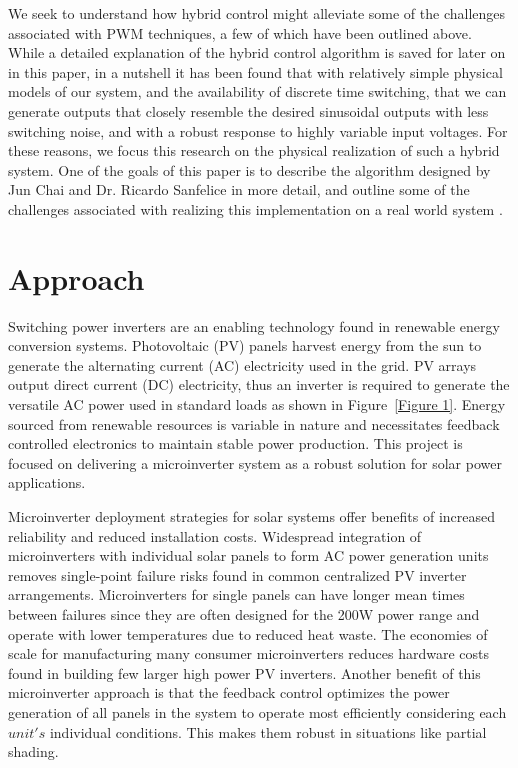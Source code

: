 We seek to understand how hybrid control might alleviate some of the challenges associated with PWM techniques, a few of which have been outlined above. While a detailed explanation of the hybrid control algorithm is saved for later on in this paper, in a nutshell it has been found that with relatively simple physical models of our system, and the availability of discrete time switching, that we can generate outputs that closely resemble the desired sinusoidal outputs with less switching noise, and with a robust response to highly variable input voltages. For these reasons, we focus this research on the physical realization of such a hybrid system. One of the goals of this paper is to describe the algorithm designed by Jun Chai and Dr. Ricardo Sanfelice in more detail, and outline some of the challenges associated with realizing this implementation on a real world system \cite{ricardo}.


\section{Approach}
Switching power inverters are an enabling technology found in renewable energy conversion systems. Photovoltaic (PV) panels harvest energy from the sun to generate the alternating current (AC) electricity used in the grid. PV arrays output direct current (DC) electricity, thus an inverter is required to generate the versatile AC power used in standard loads as shown in Figure~\ref{Figure 1}. Energy sourced from renewable resources is variable in nature and necessitates feedback controlled electronics to maintain stable power production.  This project is focused on delivering a microinverter system as a robust solution for solar power applications. 

Microinverter deployment strategies for solar systems offer benefits of increased reliability and reduced installation costs. Widespread integration of microinverters with individual solar panels to form AC power generation units removes single-point failure risks found in common centralized PV inverter arrangements. Microinverters for single panels can have longer mean times between failures since they are often designed for the 200W power range and operate with lower temperatures due to reduced heat waste. The economies of scale for manufacturing many consumer microinverters reduces hardware costs found in building few larger high power PV inverters.\cite{microchip} Another benefit of this microinverter approach is that the feedback control optimizes the power generation of all panels in the system to operate most efficiently considering each $unit's$ individual conditions. This makes them robust in situations like partial shading.



